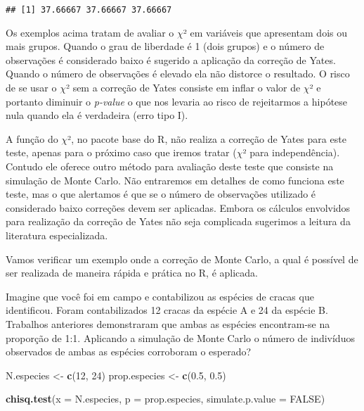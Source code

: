 \documentclass[14pt,titlepage, oneside, openany, a4paper]{book}
\newenvironment{Shaded}{\begin{snugshade}}{\end{snugshade}}
\newcommand{\DataTypeTok}[1]{\textcolor[rgb]{0.13,0.29,0.53}{#1}}
\newcommand{\DecValTok}[1]{\textcolor[rgb]{0.00,0.00,0.81}{#1}}
\newcommand{\FloatTok}[1]{\textcolor[rgb]{0.00,0.00,0.81}{#1}}
\newcommand{\KeywordTok}[1]{\textcolor[rgb]{0.13,0.29,0.53}{\textbf{#1}}}
\newcommand{\NormalTok}[1]{#1}
\newcommand{\OtherTok}[1]{\textcolor[rgb]{0.56,0.35,0.01}{#1}}
\newcommand{\StringTok}[1]{\textcolor[rgb]{0.31,0.60,0.02}{#1}}
\begin{document}
\begin{verbatim}
## [1] 37.66667 37.66667 37.66667
\end{verbatim}

Os exemplos acima tratam de avaliar o \(\chi\)² em variáveis que apresentam dois ou mais grupos. Quando o grau de liberdade é 1 (dois grupos) e o número de observações é considerado baixo é sugerido a aplicação da correção de Yates. Quando o número de observações é elevado ela não distorce o resultado. O risco de se usar o \(\chi\)² sem a correção de Yates consiste em inflar o valor de \(\chi\)² e portanto diminuir o \emph{p-value} o que nos levaria ao risco de rejeitarmos a hipótese nula quando ela é verdadeira (erro tipo I).

A função do \(\chi\)², no pacote base do R, não realiza a correção de Yates para este teste, apenas para o próximo caso que iremos tratar (\(\chi\)² para independência). Contudo ele oferece outro método para avaliação deste teste que consiste na simulação de Monte Carlo. Não entraremos em detalhes de como funciona este teste, mas o que alertamos é que se o número de observações utilizado é considerado baixo correções devem ser aplicadas. Embora os cálculos envolvidos para realização da correção de Yates não seja complicada sugerimos a leitura da literatura especializada.

Vamos verificar um exemplo onde a correção de Monte Carlo, a qual é possível de ser realizada de maneira rápida e prática no R, é aplicada.

Imagine que você foi em campo e contabilizou as espécies de cracas que identificou. Foram contabilizados 12 cracas da espécie A e 24 da espécie B. Trabalhos anteriores demonstraram que ambas as espécies encontram-se na proporção de 1:1. Aplicando a simulação de Monte Carlo o número de indivíduos observados de ambas as espécies corroboram o esperado?

\begin{Shaded}
\begin{Highlighting}[]
\NormalTok{N.especies <-}\StringTok{ }\KeywordTok{c}\NormalTok{(}\DecValTok{12}\NormalTok{, }\DecValTok{24}\NormalTok{)}
\NormalTok{prop.especies <-}\StringTok{ }\KeywordTok{c}\NormalTok{(}\FloatTok{0.5}\NormalTok{, }\FloatTok{0.5}\NormalTok{)}

\KeywordTok{chisq.test}\NormalTok{(}\DataTypeTok{x =}\NormalTok{ N.especies, }\DataTypeTok{p =}\NormalTok{ prop.especies, }\DataTypeTok{simulate.p.value =} \OtherTok{FALSE}\NormalTok{)}
\end{Highlighting}
\end{Shaded}
\end{document}
